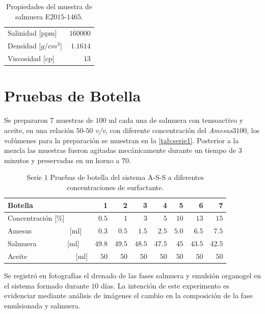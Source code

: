 \begin{table}
    \caption[Salmuera E$2015$-$1465$] {Propiedades del muestra de salmuera E$2015$-$1465$.}
    \centering
    \begin{tabulary}{1.1\textwidth}{L |R}
        \toprule
        Salinidad [ppm] & $160000$ \\
        Densidad [$g/cm^{3}$] & $1.1614$ \\
        Viscosidad [cp] & $13$  \\
        \midrule
        \bottomrule
    \end{tabulary}
    \label{tab:salmuera}
\end{table}

\section{Pruebas de Botella}
Se prepararon $7$ muestras de $100$ ml cada una de salmuera con tensoactivo y aceite, en una relación $50$-$50$ \textit{v/v}, con diferente concentración del \emph{Amesus$3100$}, los volúmenes para la preparación se muestran en la \autoref{tab:serie1}. Posterior a la mezcla las muestras fueron agitadas mecánicamente durante un tiempo de $3$ minutos y preservadas en un horno a $70$\celsius.

 \begin{table} 
    \caption[Pruebas de botella]{Serie $1$ Pruebas de botella del sistema A-S-S a diferentes concentraciones de surfactante.}
    \centering
    \begin{tabulary}{1.1\textwidth}{L |R|R|R|R|R|R|R}
        \toprule
        Botella & \textbf{1} & \textbf{2} & \textbf{3} & \textbf{4} & \textbf{5} & \textbf{6} & \textbf{7} \\
        \midrule
        Concentración [\%] & $0.5$  & $1$ & $3$  & $5$ & $10$ & $13$ & $15$ \\
        Amesus ~~~~~~~~~~[ml] & $0.3$  & $0.5$ & $1.5$ & $2.5$ & $5.0$ & $6.5$ & $7.5$ \\
        Salmuera ~~~~~~~~[ml] & $49.8$ & $49.5$ & $48.5$ & $47.5$ & $45$ & $43.5$ & $42.5$ \\
        Aceite ~~~~~~~~~~~~~[ml] & $50$ & $50$ & $50$ & $50$ & $50$ & $50$ & $50$ \\
        \midrule
        \bottomrule
    \end{tabulary}
    \label{tab:serie1}
\end{table}

Se registró en fotografías el drenado de las fases salmuera y emulsión organogel en el sistema formado durante $10$ días. La intención de este experimento es evidenciar mediante análisis de imágenes el cambio en la composición de la fase emulsionada y salmuera.


